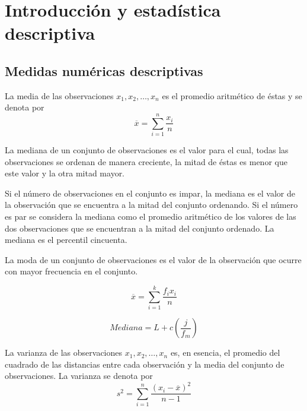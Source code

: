 \chapter{Introducción y estadística descriptiva}

\setcounter{section}{2}
\section{Medidas numéricas descriptivas}

\begin{def.} La media de las observaciones $x_1,x_2,\ldots , x_n$ es el promedio aritmético de éstas y se denota por 
    \begin{equation}
	\overline{x} = \sum_{i=1}^{n} \dfrac{x_i}{n}
    \end{equation}
\end{def.}

\begin{def.} La mediana de un conjunto de observaciones es el valor para el cual, todas las observaciones se ordenan de manera creciente, la mitad de éstas es menor que este valor y la otra mitad mayor.
\end{def.}

Si el número de observaciones en el conjunto es impar, la mediana es el valor de la observación que se encuentra a la mitad del conjunto ordenando. Si el número es par se considera la mediana como el promedio aritmético de los valores de las dos observaciones que se encuentran a la mitad del conjunto ordenado. La mediana es el percentil cincuenta. 

\begin{def.} La moda de un conjunto de observaciones es el valor de la observación que ocurre con mayor frecuencia en el conjunto.
\end{def.}

    \begin{equation}
	\overline{x} = \sum_{i=1}^{k} \dfrac{f_i x_i}{n}
    \end{equation}

    \begin{equation}
	Mediana = L + c\left( \dfrac{j}{f_m}\right)
    \end{equation}

\begin{def.} La varianza de las observaciones $x_1,x_2,\ldots , x_n$ es, en esencia, el promedio del cuadrado de las distancias entre cada observación y la media del conjunto de observaciones. La varianza se denota por 
    \begin{equation}
	s^2 = \sum_{i=1}^{n} \dfrac{(x_i - \overline{x})^2}{n-1}
    \end{equation}
\end{def.}

